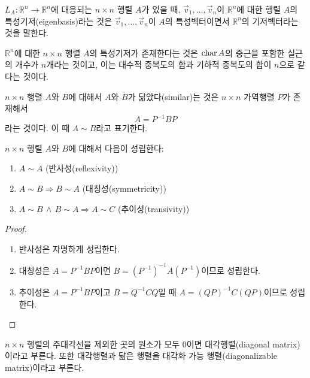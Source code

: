 \documentclass[../engineering_mathematics_lecture_note.tex]{subfiles}
\begin{document}
\begin{definition}
    $L_A: \mathbb R^n \rightarrow \mathbb R^n$에 대응되는 $n \times n$ 행렬 $A$가 있을 때, $\vec v_1, \dots, \vec v_n$이 $\mathbb R^n$에 대한 행렬 $A$의 특성기저(eigenbasis)라는 것은 $\vec v_1, \dots, \vec v_n$이 $A$의 특성벡터이면서 $\mathbb R^n$의 기저벡터라는 것을 말한다.
\end{definition}

\begin{remark}
    $\mathbb R^n$에 대한 $n \times n$ 행렬 $A$의 특성기저가 존재한다는 것은 $\operatorname{char} A$의 중근을 포함한 실근의 개수가 $n$개라는 것이고, 이는 대수적 중복도의 합과 기하적 중복도의 합이 $n$으로 같다는 것이다.
\end{remark}

\begin{definition}
    $n \times n$ 행렬 $A$와 $B$에 대해서 $A$와 $B$가 닮았다(similar)는 것은 $n \times n$ 가역행렬 $P$가 존재해서
    \begin{equation*}
        A = P^{-1} B P
    \end{equation*}
    라는 것이다.
    이 때 $A \sim B$라고 표기한다.
\end{definition}

\begin{theorem}
    $n \times n$ 행렬 $A$와 $B$에 대해서 다음이 성립한다:
    \begin{enumerate}
        \item $A \sim A$ (반사성(reflexivity))
        \item $A \sim B \Rightarrow B \sim A$ (대칭성(symmetricity))
        \item $A \sim B \,\wedge\, B \sim A \Rightarrow A \sim C$ (추이성(transivity))
    \end{enumerate}
\end{theorem}

\begin{proof}
    \leavevmode
    \begin{enumerate}
        \item 반사성은 자명하게 성립한다.
        \item 대칭성은 $A = P^{-1} B P$이면 $B = (P^{-1})^{-1} A (P^{-1})$이므로 성립한다.
        \item 추이성은 $A = P^{-1}BP$이고 $B = Q^{-1} C Q$일 때 $A = (QP)^{-1} C (QP)$이므로 성립한다.
    \end{enumerate}
\end{proof}

\begin{definition}
    $n \times n$ 행렬의 주대각선을 제외한 곳의 원소가 모두 0이면 대각행렬(diagonal matrix)이라고 부른다.
    또한 대각행렬과 닮은 행렬을 대각화 가능 행렬(diagonalizable matrix)이라고 부른다.
\end{definition}
\end{document}
